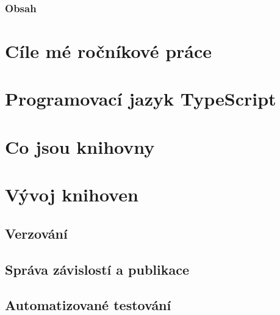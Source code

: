 




\begin{frame}
    \frametitle{Obsah}
    \tableofcontents
\end{frame}

\section[Ročníková práce]{Cíle mé ročníkové práce}	

	

\section[TypeScript]{Programovací jazyk TypeScript}





\section[Knihovny]{Co jsou knihovny}



\section[Vývoj knihoven]{Vývoj knihoven}

	

\subsection{Verzování}



\subsection[Správce balíčků]{Správa závislostí a publikace}



\subsection[Testování]{Automatizované testování}

	


